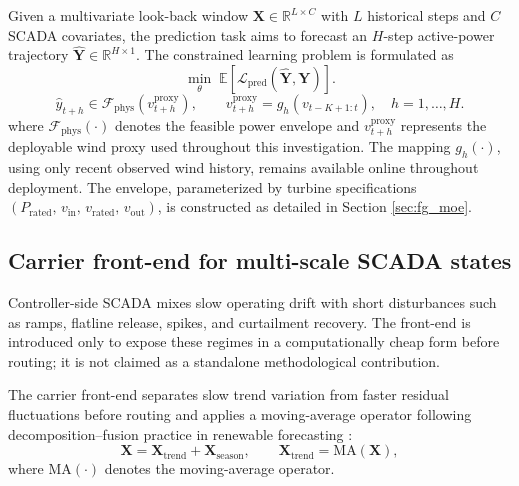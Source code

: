 \documentclass[review,1p,times]{elsarticle}
\begin{document}
Given a multivariate look-back window $\mathbf{X}\in\mathbb{R}^{L\times C}$ with $L$ historical steps and $C$ SCADA covariates, the prediction task aims to forecast an $H$-step active-power trajectory $\hat{\mathbf{Y}}\in\mathbb{R}^{H\times 1}$. The constrained learning problem is formulated as
\begin{equation}
\min_{\theta} \; \mathbb{E}\left[\mathcal{L}_{\text{pred}}(\hat{\mathbf{Y}}, \mathbf{Y})\right].
\end{equation}
\begin{equation}
\hat{y}_{t+h} \in \mathcal{F}_{\text{phys}}(v_{t+h}^{\mathrm{proxy}}),\qquad
v_{t+h}^{\mathrm{proxy}}=g_h(v_{t-K+1:t}),\quad h=1,\ldots,H.
\end{equation}
where $\mathcal{F}_{\text{phys}}(\cdot)$ denotes the feasible power envelope and $v_{t+h}^{\mathrm{proxy}}$ represents the deployable wind proxy used throughout this investigation. The mapping $g_h(\cdot)$, using only recent observed wind history, remains available online throughout deployment. The envelope, parameterized by turbine specifications $(P_{\mathrm{rated}},\,v_{\mathrm{in}},\,v_{\mathrm{rated}},\,v_{\mathrm{out}})$, is constructed as detailed in Section \ref{sec:fg_moe}.

\subsection{Carrier front-end for multi-scale SCADA states}
\label{subsec:decomposition}

Controller-side SCADA mixes slow operating drift with short disturbances such as ramps, flatline release, spikes, and curtailment recovery. The front-end is introduced only to expose these regimes in a computationally cheap form before routing; it is not claimed as a standalone methodological contribution.

The carrier front-end separates slow trend variation from faster residual fluctuations before routing and applies a moving-average operator following decomposition--fusion practice in renewable forecasting \citep{li2023vmdcnn,ma2022gcnwind}:
\begin{equation}
\mathbf{X} = \mathbf{X}_{\text{trend}} + \mathbf{X}_{\text{season}}, \qquad 
\mathbf{X}_{\text{trend}} = \text{MA}(\mathbf{X}),
\end{equation}
where $\text{MA}(\cdot)$ denotes the moving-average operator.
\end{document}
